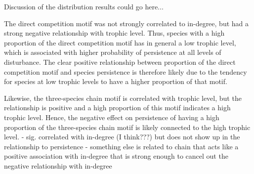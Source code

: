 \documentclass[12pt]{article}
\begin{document}
\begin{spacing}{2.0}
    Discussion of the distribution results could go here...
 





The direct competition motif was not strongly correlated to in-degree, but had a strong negative relationship with trophic level. Thus, species with a high proportion of the direct competition motif has in general a low trophic level, which is associated with higher probability of persistence at all levels of disturbance.
The clear positive relationship between proportion of the direct competition motif and species persistence is therefore likely due to the tendency for species at low trophic levels to have a higher proportion of that motif.


Likewise, the three-species chain motif is correlated with trophic level, but the relationship is positive and a high proportion of this motif indicates a high trophic level. Hence, the negative effect on persistence of having a high proportion of the three-species chain motif is likely connected to the high trophic level. 
- sig. correlated with in-degree (I think???) but does not show up in the relationship to persistence
- something else is related to chain that acts like a positive association with in-degree that is strong enough to cancel out the negative relationship with in-degree




\end{spacing}
\end{document}
